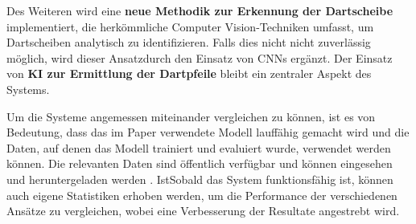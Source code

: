 Des Weiteren wird eine \textbf{neue Methodik zur Erkennung der Dartscheibe} implementiert, die herkömmliche Computer Vision-Techniken umfasst, um Dartscheiben analytisch zu identifizieren. Falls dies nicht nicht zuverlässig möglich, wird dieser Ansatzdurch den Einsatz von CNNs ergänzt. Der Einsatz von \textbf{KI zur Ermittlung der Dartpfeile} bleibt ein zentraler Aspekt des Systems.

Um die Systeme angemessen miteinander vergleichen zu können, ist es von Bedeutung, dass das im Paper verwendete Modell lauffähig gemacht wird und die Daten, auf denen das Modell trainiert und evaluiert wurde, verwendet werden können. Die relevanten Daten sind öffentlich verfügbar und können eingesehen und heruntergeladen werden \cite{deepdarts-data}. IstSobald das System funktionsfähig ist, können auch eigene Statistiken erhoben werden, um die Performance der verschiedenen Ansätze zu vergleichen, wobei eine Verbesserung der Resultate angestrebt wird.

\iffalse

